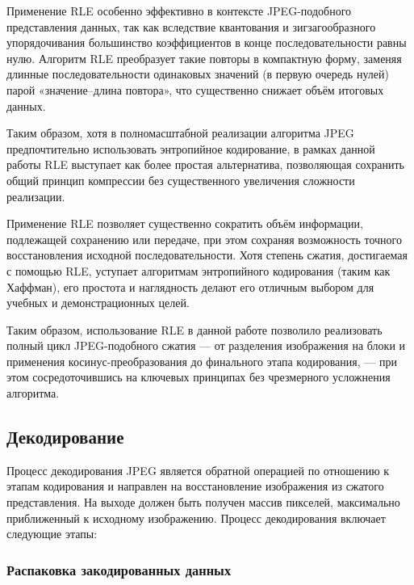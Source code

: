 Применение RLE особенно эффективно в контексте JPEG-подобного представления данных, 
так как вследствие квантования и зигзагообразного упорядочивания большинство коэффициентов в конце последовательности равны нулю.
Алгоритм RLE преобразует такие повторы в компактную форму, 
заменяя длинные последовательности одинаковых значений (в первую очередь нулей) парой «значение–длина повтора», 
что существенно снижает объём итоговых данных.

Таким образом, хотя в полномасштабной реализации алгоритма JPEG предпочтительно использовать энтропийное кодирование, 
в рамках данной работы RLE выступает как более простая альтернатива, 
позволяющая сохранить общий принцип компрессии без существенного увеличения сложности реализации.


\begin{RLETable}
\end{RLETable}


\begin{RLEEncodedTable}
\end{RLEEncodedTable}


Применение RLE позволяет существенно сократить объём информации, подлежащей сохранению или передаче, 
при этом сохраняя возможность точного восстановления исходной последовательности. 
Хотя степень сжатия, достигаемая с помощью RLE, уступает алгоритмам энтропийного кодирования (таким как Хаффман), 
его простота и наглядность делают его отличным выбором для учебных и демонстрационных целей.

Таким образом, использование RLE в данной работе позволило реализовать полный цикл JPEG-подобного сжатия — от разделения изображения 
на блоки и применения косинус-преобразования до финального этапа кодирования, — при этом сосредоточившись на ключевых принципах без 
чрезмерного усложнения алгоритма.



\subsection{Декодирование}

Процесс декодирования JPEG является обратной операцией по отношению к этапам кодирования
и направлен на восстановление изображения из сжатого представления. 
На выходе должен быть получен массив пикселей, максимально приближенный к исходному изображению. 
Процесс декодирования включает следующие этапы:

 
\subsubsection{Распаковка закодированных данных}


